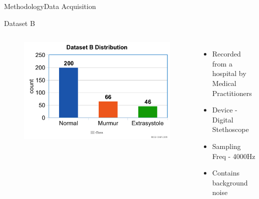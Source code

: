 \documentclass[10pt]{beamer}
\begin{document}
\begin{frame}{Methodology}{Data Acquisition}
{	\begin{block}{Dataset B}
		
		\begin{columns}
			\begin{figure}
				\centering
				\includegraphics[scale = 0.13]{AAUgraphics/db.png}
			\end{figure}
			
			\begin{itemize}
				\item Recorded from a hospital by Medical Practitioners
				\item Device - Digital Stethoscope
				\item Sampling Freq - 4000Hz
				\item Contains background noise
			\end{itemize}
			
		\end{columns}
	\end{block}  
}
\end{frame}

\end{document}
